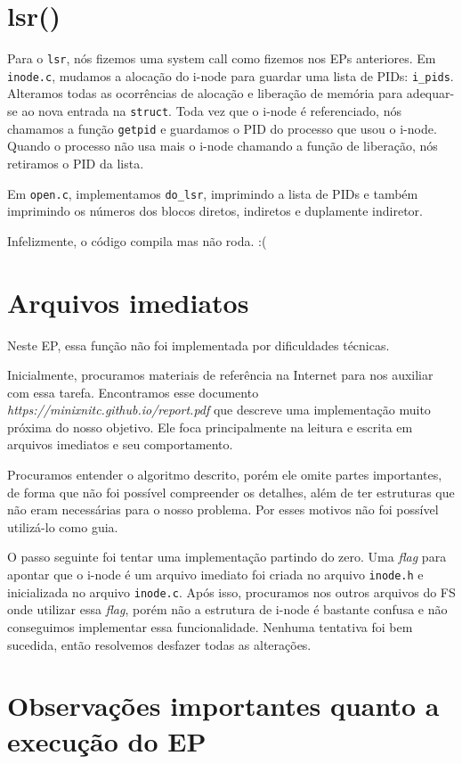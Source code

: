 \documentclass{amsart}
\theoremstyle{plain}
\newcommand{\code}[1]{\lstinline[mathescape=true]{#1}}
\begin{document}
\section{lsr()}

Para o \code{lsr}, nós fizemos uma system call como fizemos nos EPs anteriores. Em \code{inode.c},
mudamos a alocação do i-node para guardar uma lista de PIDs: \code{i_pids}. Alteramos todas as
ocorrências de alocação e liberação de memória para adequar-se ao nova entrada na \code{struct}.
Toda vez que o i-node é referenciado, nós chamamos a função \code{getpid} e guardamos o PID do
processo que usou o i-node. Quando o processo não usa mais o i-node chamando a função de liberação,
nós retiramos o PID da lista.

Em \code{open.c}, implementamos \code{do_lsr}, imprimindo a lista de PIDs e também imprimindo os
números dos blocos diretos, indiretos e duplamente indiretor.

Infelizmente, o código compila mas não roda. :(

\section{Arquivos imediatos}

Neste EP, essa função não foi implementada por dificuldades técnicas.

Inicialmente, procuramos materiais de referência na Internet para nos auxiliar com essa tarefa. Encontramos esse documento \emph{https://minixnitc.github.io/report.pdf} que descreve uma implementação muito próxima do nosso objetivo. Ele foca principalmente na leitura e escrita em arquivos imediatos e seu comportamento.

Procuramos entender o algoritmo descrito, porém ele omite partes importantes, de forma que não foi possível compreender os detalhes, além de ter estruturas que não eram necessárias para o nosso problema. Por esses motivos não foi possível utilizá-lo como guia.

O passo seguinte foi tentar uma implementação partindo do zero. Uma \emph{flag} para apontar que o i-node é um arquivo imediato foi criada no arquivo \code{inode.h} e inicializada no arquivo \code{inode.c}. Após isso, procuramos nos outros arquivos do FS onde utilizar essa \emph{flag}, porém não a estrutura de i-node é bastante confusa e não conseguimos implementar essa funcionalidade. Nenhuma tentativa foi bem sucedida, então resolvemos desfazer todas as alterações.


\section{Observações importantes quanto a execução do EP}
\end{document}
